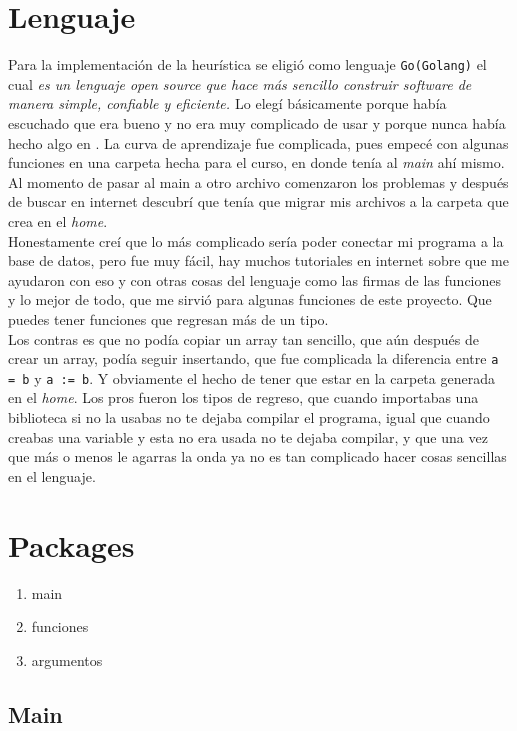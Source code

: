\documentclass[
10pt,
a4paper,
oneside,
headinclude,footinclude,
BCOR5mm,
]{article}
\begin{document}
\section{Lenguaje}

Para la implementación de la heurística se eligió como lenguaje
\texttt{Go(Golang)} el cual \textit{es un lenguaje open source que hace más
  sencillo construir software de manera simple, confiable y eficiente.
  \cite{Golang01}} Lo elegí básicamente porque había escuchado que era bueno y
no era muy complicado de usar y porque nunca había hecho algo en \GO. La
curva de aprendizaje fue complicada, pues empecé con algunas funciones en una
carpeta hecha para el curso, en donde tenía al \textit{main} ahí mismo. Al
momento de pasar al main a otro archivo comenzaron los problemas y después de
buscar en internet descubrí que tenía que migrar mis archivos a la carpeta que
\GO crea en el \textit{home}.\\
Honestamente creí que lo más complicado sería poder conectar mi programa a la
base de datos, pero fue muy fácil, hay muchos tutoriales en internet sobre
\GO que me ayudaron con eso y con otras cosas del lenguaje como las firmas de las
funciones y lo mejor de todo, que me sirvió para algunas funciones de este
proyecto. Que puedes tener funciones que regresan más de un tipo.\\
Los contras es que no podía copiar un array tan sencillo, que aún después de
crear un array, podía seguir insertando, que fue complicada la diferencia entre
\texttt{a = b} y \texttt{a := b}. Y obviamente el hecho de tener que estar en la
carpeta generada en el \textit{home}.
Los pros fueron los tipos de regreso, que cuando importabas una biblioteca si no
la usabas no te dejaba compilar el programa, igual que cuando creabas una
variable y esta no era usada no te dejaba compilar, y que una vez que más o menos
le agarras la onda ya no es tan complicado hacer cosas sencillas en el lenguaje.

\section{Packages}

\begin{enumerate}[noitemsep]
\item main
\item funciones
\item argumentos
\end{enumerate}

\subsection{Main}
\end{document}
